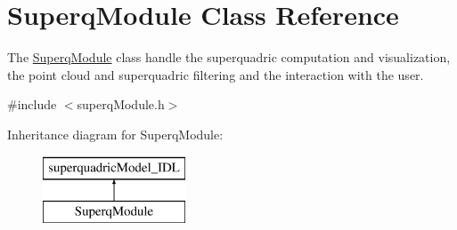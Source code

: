 \section{Superq\+Module Class Reference}
\label{classSuperqModule}


The \mbox{\hyperlink{classSuperqModule}{Superq\+Module}} class handle the superquadric computation and visualization, the point cloud and superquadric filtering and the interaction with the user.  




{\ttfamily \#include $<$superq\+Module.\+h$>$}

Inheritance diagram for Superq\+Module\+:\begin{figure}[H]
\begin{center}
\leavevmode
\includegraphics[height=2.000000cm]{classSuperqModule}
\end{center}
\end{figure}
